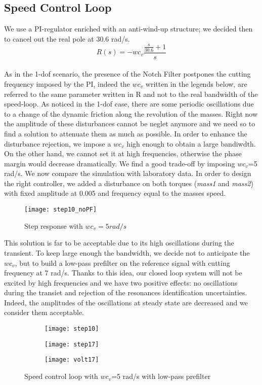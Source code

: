 \newpage 
\subsection{Speed Control Loop}
We use a PI-regulator enriched with an anti-wind-up structure; we decided then to cancel out the real pole at 30.6 rad/s.
\\
\[
R(s)=-wc_v
\frac{\frac{s}{30.6}+1}{s}
\]
\\
As in the 1-dof scenario, the presence of the Notch Filter postpones the cutting frequency imposed by the PI, indeed the $wc_v$ written in the legends below, are referred to the same parameter written in R and not to the real bandwidth of the speed-loop.
As noticed in the 1-dof case, there are some periodic oscillations due to a change of the dynamic friction along the revolution of the masses. Right now the amplitude of these disturbances cannot be neglet anymore and we need so to find a solution to attenuate them as much as possible. In order to enhance the disturbance rejection, we impose a $wc_v$ high enough to obtain a large bandiwdth. On the other hand, we cannot set it at high frequencies, otherwise the phase margin would decrease dramatically. We find a good trade-off by imposing $wc_v$=5 rad/s.
We now compare the simulation with laboratory data. In order to design the right controller, we added a disturbance on both torques (\textit{mass1} and \textit{mass2}) with fixed amplitude at 0.005 and frequency equal to the masses speed.
\begin{figure*}[h]
	\centering
	\texttt{[image: step10\_noPF]}
	\caption{Step response with $wc_v=5 rad/s$}
	\label{fig:step10_noPF}
\end{figure*}
\newline
This solution is far to be acceptable due to its high oscillations during the transient. To keep large enough the bandwidth, we decide not to anticipate the $wc_v$, but to build a low-pass prefilter on the reference signal with cutting frequency at 7 rad/s. Thanks to this idea, our closed loop system will not be excited by high frequencies and we have two positive effects: no oscillations during the transiet and rejection of the resonances identification uncertainties. Indeed, the amplitudes of the oscillations at steady state are decreased and we consider them acceptable. 

\newpage
\begin{figure*}[h]
	\centering
\begin{subfigure}{0.4\columnwidth}
	\texttt{[image: step10]}
\end{subfigure}
\begin{subfigure}{0.4\columnwidth}
	\texttt{[image: step17]}
\end{subfigure}
\begin{subfigure}{0.4\columnwidth}
	\texttt{[image: volt17]}
\end{subfigure}
\caption{Speed control loop with  $wc_{v} $=5 rad/s with low-pass prefilter}
\label{fig:PI_with_5}
\end{figure*}

